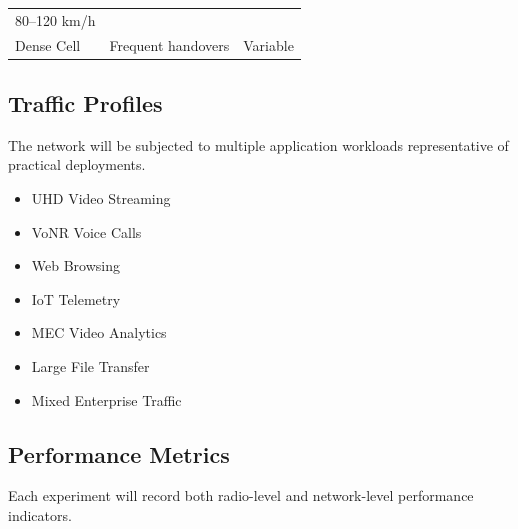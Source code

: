 \documentclass[12pt,a4paper]{article}\usepackage[a4paper,margin=1in]{geometry}\usepackage{graphicx}\usepackage{longtable}\usepackage{booktabs}\usepackage{hyperref}\usepackage{enumitem}\usepackage{amsmath}\usepackage{tikz}\usepackage{pgfgantt}\usepackage{setspace}\setstretch{1.15}\usetikzlibrary{positioning,arrows.meta,shapes.geometric}
\begin{document}
\begin{table}[h]
\begin{tabular}{p{5cm}p{8cm}c}
			80--120 km/h
			
			\\
			
			Dense Cell
			
			&
			
			Frequent handovers
			
			&
			
			Variable
			
			\\
			
			\bottomrule
			
		\end{tabular}
		
	\end{table}
	
	
	\subsection{Traffic Profiles}
	
	The network will be subjected to multiple application workloads representative of practical deployments.
	
	\begin{itemize}
		
		\item UHD Video Streaming
		
		\item VoNR Voice Calls
		
		\item Web Browsing
		
		\item IoT Telemetry
		
		\item MEC Video Analytics
		
		\item Large File Transfer
		
		\item Mixed Enterprise Traffic
		
	\end{itemize}
	
	
	\subsection{Performance Metrics}
	
	Each experiment will record both radio-level and network-level performance indicators.
	
\end{document}
